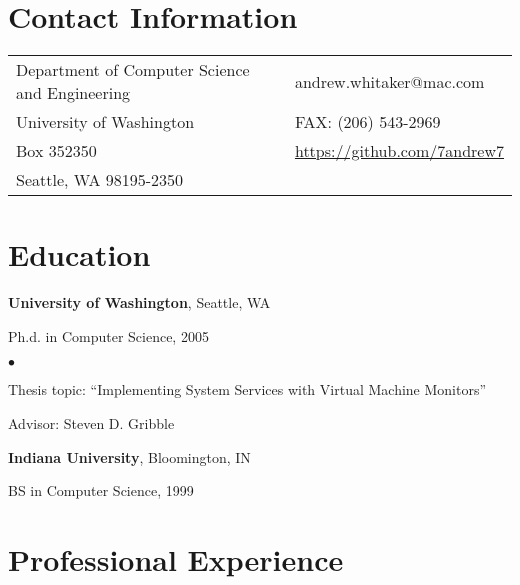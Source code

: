 \documentclass[margin,line]{res}
\newenvironment{list1}{
  \begin{list}{\ding{113}}{%
      \setlength{\itemsep}{0in}
      \setlength{\parsep}{0in} \setlength{\parskip}{0in}
      \setlength{\topsep}{0in} \setlength{\partopsep}{0in} 
      \setlength{\leftmargin}{0.17in}}}{\end{list}}
\newenvironment{list2}{
  \begin{list}{$\bullet$}{%
      \setlength{\itemsep}{0in}
      \setlength{\parsep}{0in} \setlength{\parskip}{0in}
      \setlength{\topsep}{0in} \setlength{\partopsep}{0in} 
      \setlength{\leftmargin}{0.2in}}}{\end{list}}
\begin{document}

\begin{resume}
\section{\sc Contact Information}
\vspace{.05in}
\begin{tabular}{@{}p{4in}p{2in}}
Department of Computer Science and Engineering & andrew.whitaker@mac.com \\
University of Washington &  FAX: (206) 543-2969  \\
Box 352350 & \url{https://github.com/7andrew7}        \\
Seattle, WA 98195-2350  \\
\end{tabular}

\section{\sc Education}
{\bf University of Washington}, Seattle, WA\\
\vspace*{-.1in}
\begin{list1}
\item[] Ph.d. in Computer Science, 2005
\begin{list2}
  \vspace*{.05in}
  \item Thesis topic: ``Implementing System Services with Virtual Machine Monitors''
  \item Advisor: Steven D. Gribble
\end{list2}
\end{list1}

{\bf Indiana University}, Bloomington, IN \\
\vspace*{-.1in}
\begin{list1}
\item[] BS in Computer Science, 1999
\end{list1}

\section{\sc Professional Experience}


\end{resume}
\end{document}
